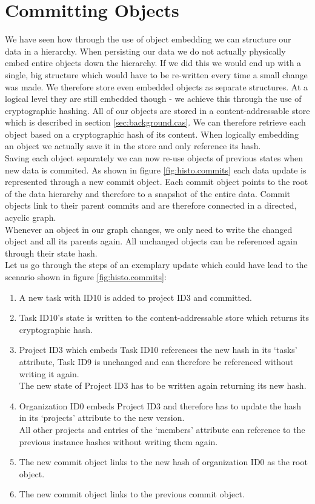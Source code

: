 \section{Committing Objects}
We have seen how through the use of object embedding we can structure our data in a hierarchy.
When persisting our data we do not actually physically embed entire objects down the hierarchy.
If we did this we would end up with a single, big structure which would have to be re-written every time a small change was made.
We therefore store even embedded objects as separate structures.
At a logical level they are still embedded though - we achieve this through the use of cryptographic hashing.
All of our objects are stored in a content-addressable store which is described in section \ref{sec:background.cas}.
We can therefore retrieve each object based on a cryptographic hash of its content.
When logically embedding an object we actually save it in the store and only reference its hash.\\
Saving each object separately we can now re-use objects of previous states when new data is commited.
As shown in figure \ref{fig:histo.commits} each data update is represented through a new commit object.
Each commit object points to the root of the data hierarchy and therefore to a snapshot of the entire data.
Commit objects link to their parent commits and are therefore connected in a directed, acyclic graph.\\
Whenever an object in our graph changes, we only need to write the changed object and all its parents again.
All unchanged objects can be referenced again through their state hash.\\

Let us go through the steps of an exemplary update which could have lead to the scenario shown in figure \ref{fig:histo.commits}:

\begin{enumerate}
\item A new task with ID10 is added to project ID3 and committed.
\item Task ID10's state is written to the content-addressable store which returns its cryptographic hash.
\item Project ID3 which embeds Task ID10 references the new hash in its `tasks' attribute, Task ID9 is unchanged and can therefore be referenced without writing it again.\\
The new state of Project ID3 has to be written again returning its new hash.
\item Organization ID0 embeds Project ID3 and therefore has to update the hash in its `projects' attribute to the new version.\\
All other projects and entries of the `members' attribute can reference to the previous instance hashes without writing them again.
\item The new commit object links to the new hash of organization ID0 as the root object.
\item The new commit object links to the previous commit object.
\end{enumerate}

